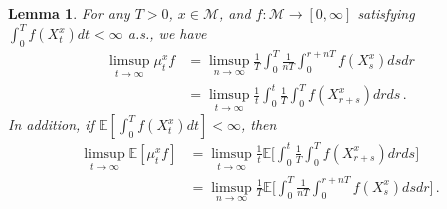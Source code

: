 \documentclass[10pt,a4paper]{amsart}
\newtheorem{lem}{Lemma}
\newcommand{\E}{\mathbb{E}}
\newcommand{\mcM}{\mathcal{M}}
\begin{document}
\begin{lem}\label{time-equivalence}
    For any $T > 0$, $x \in \mcM$, and $f: \mcM \to [0,\infty]$ satisfying $\int_0^Tf(X_t^x)dt < \infty$ a.s., we have 
\begin{align*}
    \limsup_{t \to \infty} \mu_t^x f &
    = \limsup_{n \to \infty} \frac{1}{T}\int_0^T \frac{1}{nT} \int_0^{r + nT} f(X_s^x)dsdr \\
    &= 
    \limsup_{t \to \infty} \frac{1}{t}\int_0^t \frac{1}{T} \int_0^T f(X_{r+s}^x)drds 
     \,.
\end{align*}
  In addition, if   $\E[\int_0^Tf(X_t^x)dt] < \infty$, then
\begin{align*}  
    \limsup_{t \to \infty} \E[\mu_t^x f] &= 
    \limsup_{t \to \infty} \frac{1}{t}
    \E\Big[\int_0^t \frac{1}{T} \int_0^T f(X_{r+s}^x)drds\Big] \\
    &= \limsup_{n \to \infty} \frac{1}{T}\E\Big[ \int_0^T \frac{1}{nT} \int_0^{r + nT} f(X_s^x)dsdr\Big] \,.
\end{align*}
    
    
    
    
    
    
\end{lem}
\end{document}
